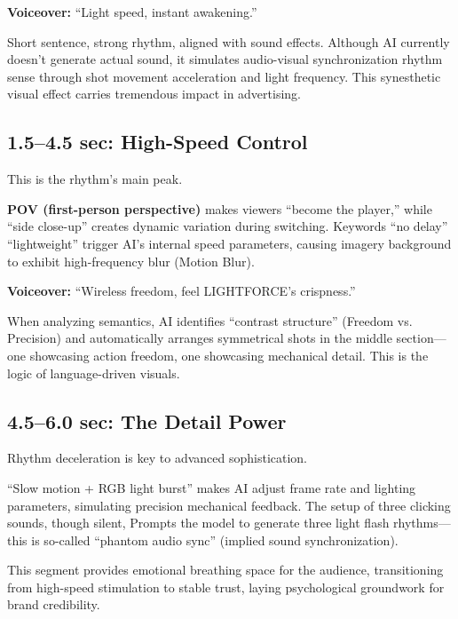 \textbf{Voiceover:} ``Light speed, instant awakening.''

Short sentence, strong rhythm, aligned with sound effects. Although AI currently doesn't generate actual sound, it simulates audio-visual synchronization rhythm sense through shot movement acceleration and light frequency. This synesthetic visual effect carries tremendous impact in advertising.

\subsection{1.5--4.5 sec: High-Speed Control}
\label{subsec:highspeed-control}

This is the rhythm's main peak.

\textbf{POV (first-person perspective)} makes viewers ``become the player,'' while ``side close-up'' creates dynamic variation during switching. Keywords ``no delay'' ``lightweight'' trigger AI's internal speed parameters, causing imagery background to exhibit high-frequency blur (Motion Blur).

\textbf{Voiceover:} ``Wireless freedom, feel LIGHTFORCE's crispness.''

When analyzing semantics, AI identifies ``contrast structure'' (Freedom vs. Precision) and automatically arranges symmetrical shots in the middle section—one showcasing action freedom, one showcasing mechanical detail. This is the logic of language-driven visuals.

\subsection{4.5--6.0 sec: The Detail Power}
\label{subsec:detail-power}

Rhythm deceleration is key to advanced sophistication.

``Slow motion + RGB light burst'' makes AI adjust frame rate and lighting parameters, simulating precision mechanical feedback. The setup of three clicking sounds, though silent, Prompts the model to generate three light flash rhythms—this is so-called ``phantom audio sync'' (implied sound synchronization).

This segment provides emotional breathing space for the audience, transitioning from high-speed stimulation to stable trust, laying psychological groundwork for brand credibility.

